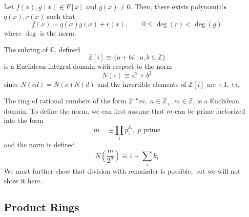   \begin{theorem}
    Let $f(x), g(x) \in F[x]$ and $g(x) \neq 0$. Then, there exists polynomials $q(x), r(x)$ such that 
    \begin{equation}
      f(x) = q(x) g(x) + r(x), \qquad 0 \leq \deg(r) < \deg(g)
    \end{equation}
    where $\deg$ is the norm.
  \end{theorem}

  \begin{example}
    The subring of $\mathbb{C}$, defined
    \begin{equation}
      \mathbb{Z}[i] \equiv \{ a + b i \mid a, b \in \mathbb{Z} \}
    \end{equation}
    is a Euclidean integral domain with respect to the norm 
    \begin{equation}
      N(c) \equiv a^2 + b^2
    \end{equation}
    since $N(c d) = N(c) N(d)$ and the invertible elements of $\mathbb{Z}[i]$ are $\pm 1, \pm i$. 
  \end{example}

  \begin{example}
    The ring of rational numbers of the form $2^{-n} m, \; n \in \mathbb{Z}_+, m \in \mathbb{Z}$, is a Euclidean domain. To define the norm, we can first assume that $m$ can be prime factorized into the form 
    \begin{equation}
      m = \pm \prod_{i} p_{i}^{k_i}, \; p \text{ prime}
    \end{equation}
    and the norm is defined 
    \begin{equation}
      N(\frac{m}{2^n}) \equiv 1 + \sum_i k_i
    \end{equation}
    We must further show that division with remainder is possible, but we will not show it here. 
  \end{example}

  \begin{theorem}
    
  \end{theorem}

\subsection{Product Rings} 

  \begin{definition}
    
  \end{definition}


